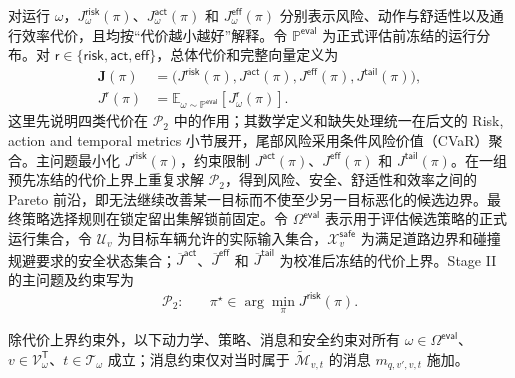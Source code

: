 \documentclass[10pt,a4paper,twocolumn]{article}
\begin{document}
对运行 $\omega$，$J_\omega^{\mathsf{risk}}(\pi)$、$J_\omega^{\mathsf{act}}(\pi)$ 和 $J_\omega^{\mathsf{eff}}(\pi)$ 分别表示风险、动作与舒适性以及通行效率代价，且均按“代价越小越好”解释。令 $\mathbb P^{\mathsf{eval}}$ 为正式评估前冻结的运行分布。对 $\mathsf r\in\{\mathsf{risk},\mathsf{act},\mathsf{eff}\}$，总体代价和完整向量定义为
\begin{equation*}
\begin{aligned}
\bm J(\pi)&=\bigl(J^{\mathsf{risk}}(\pi),J^{\mathsf{act}}(\pi),
J^{\mathsf{eff}}(\pi),J^{\mathsf{tail}}(\pi)\bigr),\\
J^{\mathsf r}(\pi)&=\mathbb E_{\omega\sim\mathbb P^{\mathsf{eval}}}
\!\left[J_\omega^{\mathsf r}(\pi)\right].
\end{aligned}
\end{equation*}
这里先说明四类代价在 $\mathcal P_2$ 中的作用；其数学定义和缺失处理统一在后文的 Risk, action and temporal metrics 小节展开，尾部风险采用条件风险价值（CVaR）聚合。主问题最小化 $J^{\mathsf{risk}}(\pi)$，约束限制 $J^{\mathsf{act}}(\pi)$、$J^{\mathsf{eff}}(\pi)$ 和 $J^{\mathsf{tail}}(\pi)$。在一组预先冻结的代价上界上重复求解 $\mathcal P_2$，得到风险、安全、舒适性和效率之间的 Pareto 前沿，即无法继续改善某一目标而不使至少另一目标恶化的候选边界。最终策略选择规则在锁定留出集解锁前固定。令 $\Omega^{\mathsf{eval}}$ 表示用于评估候选策略的正式运行集合，令 $\mathcal U_v$ 为目标车辆允许的实际输入集合，$\mathcal X_v^{\mathsf{safe}}$ 为满足道路边界和碰撞规避要求的安全状态集合；$\overline J^{\mathsf{act}}$、$\overline J^{\mathsf{eff}}$ 和 $\overline J^{\mathsf{tail}}$ 为校准后冻结的代价上界。Stage II 的主问题及约束写为
\begin{equation}\label{eq:P2}
\begin{aligned}
\mathcal P_2:\quad
&\pi^\star\in\arg\min_{\pi}
J^{\mathsf{risk}}(\pi).
\end{aligned}
\end{equation}
\addtocounter{equation}{-1}
\allowdisplaybreaks[4]
除代价上界约束外，以下动力学、策略、消息和安全约束对所有 $\omega\in\Omega^{\mathsf{eval}}$、$v\in\mathcal V^{\mathsf T}_{\omega}$、$t\in\mathcal T_{\omega}$ 成立；消息约束仅对当时属于 $\widetilde{\mathcal M}_{v,t}$ 的消息 $m_{q,v',v,t}$ 施加。
\end{document}
